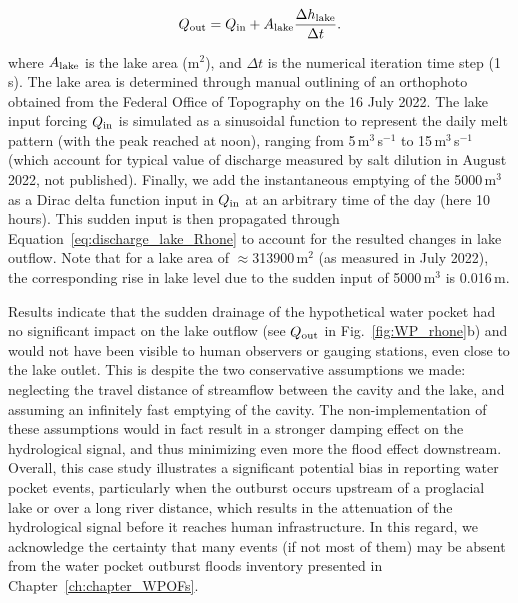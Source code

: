 \begin{equation}
  \label{eq:discharge_lake_Rhone}
Q_{\rm out} = Q_{\rm in} + A_{\rm lake}\frac{\Delta h_{\rm lake}}{\Delta t}.
\end{equation}

where $A_{\rm lake}$ is the lake area (m$^2$), and $\Delta t$ is the numerical iteration time step (1\,s). The lake area is determined through manual outlining of an orthophoto obtained from the Federal Office of Topography on the 16 July 2022. The lake input forcing $Q_{\rm in}$ is simulated as a sinusoidal function to represent the daily melt pattern (with the peak reached at noon), ranging from 5\,m$^3$\,s$^{-1}$ to 15\,m$^3$\,s$^{-1}$ (which account for typical value of discharge measured by salt dilution in August 2022, not published).
Finally, we add the instantaneous emptying of the 5000\,m$^3$ as a Dirac delta function input in $Q_{\rm in}$ at an arbitrary time of the day (here 10 hours). This sudden input is then propagated through Equation~\ref{eq:discharge_lake_Rhone} to account for the resulted changes in lake outflow. Note that for a lake area of $\approx$313900\,m$^2$ (as measured in July 2022), the corresponding rise in lake level due to the sudden input of 5000\,m$^3$ is 0.016\,m.

Results indicate that the sudden drainage of the hypothetical water pocket had no significant impact on the lake outflow (see $Q_{\rm out}$ in Fig.~\ref{fig:WP_rhone}b) and would not have been visible to human observers or gauging stations, even close to the lake outlet. This is despite the two conservative assumptions we made: neglecting the travel distance of streamflow between the cavity and the lake, and assuming an infinitely fast emptying of the cavity. The non-implementation of these assumptions would in fact result in a stronger damping effect on the hydrological signal, and thus minimizing even more the flood effect downstream. 
Overall, this case study illustrates a significant potential bias in reporting water pocket events, particularly when the outburst occurs upstream of a proglacial lake or over a long river distance, which results in the attenuation of the hydrological signal before it reaches human infrastructure. In this regard, we acknowledge the certainty that many events (if not most of them) may be absent from the water pocket outburst floods inventory presented in Chapter~\ref{ch:chapter_WPOFs}. 



